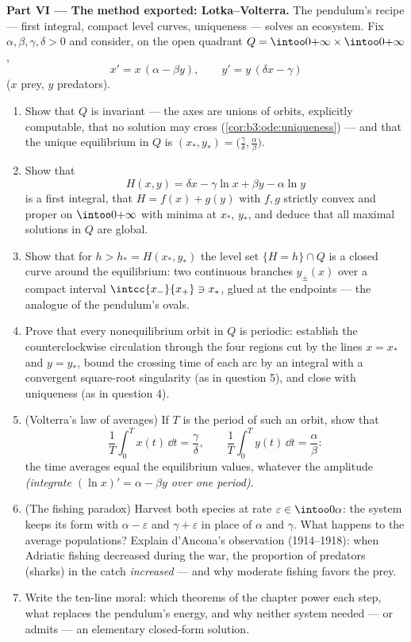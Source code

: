 \begin{problem}
\medskip
\noindent\textbf{Part VI --- The method exported:
Lotka--Volterra.} The pendulum's recipe --- first integral,
compact level curves, uniqueness --- solves an ecosystem.
Fix $\alpha, \beta, \gamma, \delta > 0$ and consider, on the
open quadrant $Q = \intoo0{+\infty}\times\intoo0{+\infty}$,
\[
x' = x\,(\alpha - \beta y), \qquad
y' = y\,(\delta x - \gamma)
\]
($x$ prey, $y$ predators).
\begin{enumerate}[resume]
  \item Show that $Q$ is invariant --- the axes are unions
        of orbits, explicitly computable, that no solution
        may cross (\cref{cor:b3:ode:uniqueness}) --- and
        that the unique equilibrium in $Q$ is $(x_*, y_*) =
        \bigl(\frac\gamma\delta, \frac\alpha\beta\bigr)$.
  \item Show that
        \[
        H(x, y) = \delta x - \gamma\ln x + \beta y -
        \alpha\ln y
        \]
        is a first integral, that $H = f(x) + g(y)$ with
        $f, g$ strictly convex and proper on
        $\intoo0{+\infty}$ with minima at $x_*$, $y_*$, and
        deduce that all maximal solutions in $Q$ are global.
  \item Show that for $h > h_* = H(x_*, y_*)$ the level set
        $\{H = h\}\cap Q$ is a closed curve around the
        equilibrium: two continuous branches $y_\pm(x)$ over
        a compact interval $\intcc{x_-}{x_+} \ni x_*$, glued
        at the endpoints --- the analogue of the pendulum's
        ovals.
  \item Prove that every nonequilibrium orbit in $Q$ is
        periodic: establish the counterclockwise circulation
        through the four regions cut by the lines $x = x_*$
        and $y = y_*$, bound the crossing time of each arc
        by an integral with a convergent square-root
        singularity (as in question 5), and close with
        uniqueness (as in question 4).
  \item (Volterra's law of averages) If $T$ is the period
        of such an orbit, show that
        \[
        \frac1T\int_0^Tx(t)\,\dd t = \frac\gamma\delta,
        \qquad
        \frac1T\int_0^Ty(t)\,\dd t = \frac\alpha\beta :
        \]
        the time averages equal the equilibrium values,
        whatever the amplitude \emph{(integrate $(\ln x)' =
        \alpha - \beta y$ over one period)}.
  \item (The fishing paradox) Harvest both species at rate
        $\varepsilon \in \intoo0\alpha$: the system keeps
        its form with $\alpha - \varepsilon$ and $\gamma +
        \varepsilon$ in place of $\alpha$ and $\gamma$. What
        happens to the average populations? Explain
        d'Ancona's observation (1914--1918): when Adriatic
        fishing decreased during the war, the proportion of
        predators (sharks) in the catch \emph{increased} ---
        and why moderate fishing favors the prey.
  \item Write the ten-line moral: which theorems of the
        chapter power each step, what replaces the
        pendulum's energy, and why neither system needed ---
        or admits --- an elementary closed-form solution.


\end{enumerate}
\end{problem}

